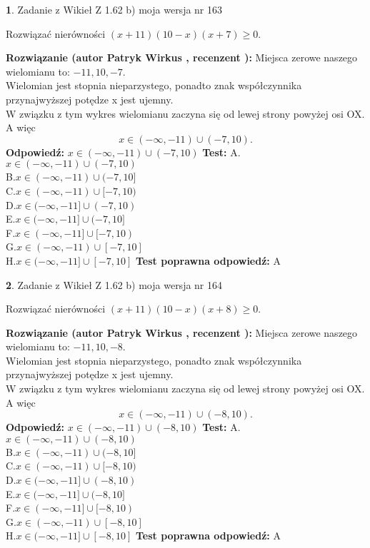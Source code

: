 \documentclass[12pt, a4paper]{article}
\theoremstyle{definition} %
\newtheorem{zad}{}
\newcommand{\zadStart}[1]{\begin{zad}#1\newline}
\newcommand{\zadStop}{\end{zad}}
\newcommand{\rozwStart}[2]{\noindent \textbf{Rozwiązanie (autor #1 , recenzent #2): }\newline}
\newcommand{\rozwStop}{\newline}
\newcommand{\odpStart}{\noindent \textbf{Odpowiedź:}\newline}
\newcommand{\odpStop}{\newline}
\newcommand{\testStart}{\noindent \textbf{Test:}\newline}
\newcommand{\testStop}{\newline}
\newcommand{\kluczStart}{\noindent \textbf{Test poprawna odpowiedź:}\newline}
\newcommand{\kluczStop}{\newline}
\begin{document}
\zadStart{Zadanie z Wikieł Z 1.62 b) moja wersja nr 163}

Rozwiązać nierówności $(x+11)(10-x)(x+7)\ge0$.
\zadStop
\rozwStart{Patryk Wirkus}{}
Miejsca zerowe naszego wielomianu to: $-11, 10, -7$.\\
Wielomian jest stopnia nieparzystego, ponadto znak współczynnika przy\linebreak najwyższej potędze x jest ujemny.\\ W związku z tym wykres wielomianu zaczyna się od lewej strony powyżej osi OX. A więc $$x \in (-\infty,-11) \cup (-7,10).$$
\rozwStop
\odpStart
$x \in (-\infty,-11) \cup (-7,10)$
\odpStop
\testStart
A.$x \in (-\infty,-11) \cup (-7,10)$\\
B.$x \in (-\infty,-11) \cup (-7,10]$\\
C.$x \in (-\infty,-11) \cup [-7,10)$\\
D.$x \in (-\infty,-11] \cup (-7,10)$\\
E.$x \in (-\infty,-11] \cup (-7,10]$\\
F.$x \in (-\infty,-11] \cup [-7,10)$\\
G.$x \in (-\infty,-11) \cup [-7,10]$\\
H.$x \in (-\infty,-11] \cup [-7,10]$
\testStop
\kluczStart
A
\kluczStop



\zadStart{Zadanie z Wikieł Z 1.62 b) moja wersja nr 164}

Rozwiązać nierówności $(x+11)(10-x)(x+8)\ge0$.
\zadStop
\rozwStart{Patryk Wirkus}{}
Miejsca zerowe naszego wielomianu to: $-11, 10, -8$.\\
Wielomian jest stopnia nieparzystego, ponadto znak współczynnika przy\linebreak najwyższej potędze x jest ujemny.\\ W związku z tym wykres wielomianu zaczyna się od lewej strony powyżej osi OX. A więc $$x \in (-\infty,-11) \cup (-8,10).$$
\rozwStop
\odpStart
$x \in (-\infty,-11) \cup (-8,10)$
\odpStop
\testStart
A.$x \in (-\infty,-11) \cup (-8,10)$\\
B.$x \in (-\infty,-11) \cup (-8,10]$\\
C.$x \in (-\infty,-11) \cup [-8,10)$\\
D.$x \in (-\infty,-11] \cup (-8,10)$\\
E.$x \in (-\infty,-11] \cup (-8,10]$\\
F.$x \in (-\infty,-11] \cup [-8,10)$\\
G.$x \in (-\infty,-11) \cup [-8,10]$\\
H.$x \in (-\infty,-11] \cup [-8,10]$
\testStop
\kluczStart
A
\kluczStop
\end{document}
